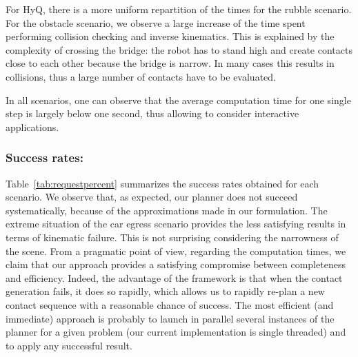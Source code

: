 For HyQ, there is a more uniform repartition of the times for the rubble scenario. For the obstacle scenario,
we observe a large increase of the time spent performing collision checking and inverse kinematics. This is explained
by the complexity of crossing the bridge: the robot has to stand high and create contacts close to each other because
the bridge is narrow. In many cases this results in collisions, thus a large number of contacts have to be evaluated.

In all scenarios, one can observe that the average computation time for one single step is largely below one second,
thus allowing to consider \gls{interactive} applications. 


\subsubsection{Success rates:}
Table~\ref{tab:requestpercent} summarizes the success rates obtained for each scenario.
We observe that, as expected, our planner does not succeed systematically, because of the approximations made in our formulation. The extreme situation of the car egress scenario provides the less satisfying results in terms of kinematic failure. This is not
surprising considering the narrowness of the scene.
From a pragmatic point of view, regarding the computation times, we claim that our approach provides a satisfying compromise between completeness and efficiency.
Indeed, the advantage of the framework is that when the contact generation fails, it does so rapidly, which allows us to rapidly re-plan a new contact sequence with a reasonable chance of success.
The most efficient (and immediate) approach is probably to launch in parallel several instances of the planner for a given problem (our current implementation is single threaded) and to apply any successful result.

